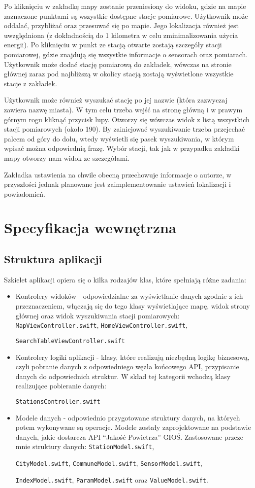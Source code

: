 \documentclass[a4paper,11pt,titlepage]{article}
\begin{document}
Po kliknięciu w zakładkę mapy zostanie przeniesiony do widoku, gdzie na mapie zaznaczone punktami są wszystkie dostępne stacje pomiarowe. Użytkownik może oddalać, przybliżać oraz przesuwać się po mapie. Jego lokalizacja również jest uwzględniona (z dokładnością do 1 kilometra w celu zminimalizowania użycia energii). Po kliknięciu w punkt ze stacją otwarte zostają szczegóły stacji pomiarowej, gdzie znajdują się wszystkie informacje o sensorach oraz pomiarach. Użytkownik może dodać stację pomiarową do zakładek, wówczas na stronie głównej zaraz pod najbliższą w okolicy stacją zostają wyświetlone wszystkie stacje z zakładek.

Użytkownik może również wyszukać stację po jej nazwie (która zazwyczaj zawiera nazwę miasta). W tym celu trzeba wejść na stronę główną i w prawym górnym rogu kliknąć przycisk lupy. Otworzy się wówczas widok z listą wszystkich stacji pomiarowych (około 190). By zainicjować wyszukiwanie trzeba przejechać palcem od góry do dołu, wtedy wyświetli się pasek wyszukiwania, w którym wpisać można odpowiednią frazę. Wybór stacji, tak jak w przypadku zakładki mapy otworzy nam widok ze szczegółami.

Zakładka ustawienia na chwile obecną przechowuje informacje o autorze, w przyszłości jednak planowane jest zaimplementowanie ustawień lokalizacji i powiadomień.

\section{Specyfikacja wewnętrzna}
\subsection{Struktura aplikacji}
Szkielet aplikacji opiera się o kilka rodzajów klas, które spełniają różne zadania:
\begin{itemize}
 	\item Kontrolery widoków - odpowiedzialne za wyświetlanie danych zgodnie z ich przeznaczeniem, włączają się do tego klasy wyświetlające mapę, widok strony głównej oraz widok wyszukiwania stacji pomiarowych:  \verb|MapViewController.swift|,  \verb|HomeViewController.swift|, 
 
\verb|SearchTableViewController.swift|
	\item Kontrolery logiki aplikacji - klasy, które realizują niezbędną logikę biznesową, czyli pobranie danych z odpowiedniego węzła końcowego API, przypisanie danych do odpowiednich struktur. W skład tej kategorii wchodzą klasy realizujące pobieranie danych:

 \verb|StationsController.swift|
	\item Modele danych - odpowiednio przygotowane struktury danych, na których potem wykonywane są operacje. Modele zostały zaprojektowane na podstawie danych, jakie dostarcza API ``Jakość Powietrza'' GIOŚ. Zastosowane przeze mnie struktury danych:  \verb|StationModel.swift|,  

\verb|CityModel.swift|,  \verb|CommuneModel.swift|,  \verb|SensorModel.swift|,  

\verb|IndexModel.swift|,  \verb|ParamModel.swift| oraz  \verb|ValueModel.swift|. 
\end{itemize}
\end{document}
